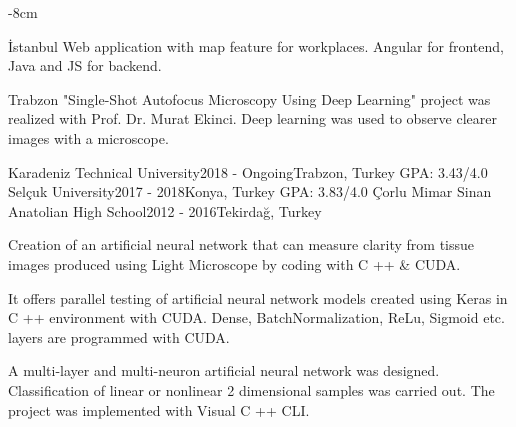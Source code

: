 \documentclass[10pt,a4paper]{altacv}
\begin{document}

\begin{adjustwidth}{}{-8cm}
\makecvheader
\end{adjustwidth}

 {İstanbul}
Web application with map feature for workplaces. Angular for frontend, Java and JS for backend.

\smallskip

 {Trabzon}
"Single-Shot Autofocus Microscopy Using Deep Learning" project was realized with Prof. Dr. Murat Ekinci. Deep learning was used to observe clearer images with a microscope.


 {Karadeniz Technical University}{2018 - Ongoing}{Trabzon, Turkey} 
\textsc{GPA}: 3.43/4.0
\smallskip
\cvevent{} {Selçuk University}{2017 - 2018}{Konya, Turkey} 
\textsc{GPA}: 3.83/4.0
\smallskip
\cvevent{} {Çorlu Mimar Sinan Anatolian High School}{2012 -  2016}{Tekirdağ, Turkey}

 {}

Creation of an artificial neural network that can measure clarity from tissue images produced using Light Microscope by coding with C ++ \& CUDA.

\divider

It offers parallel testing of artificial neural network models created using Keras in C ++ environment with CUDA. Dense, BatchNormalization, ReLu, Sigmoid etc. layers are programmed with CUDA.

\divider

A multi-layer and multi-neuron artificial neural network was designed. Classification of linear or nonlinear 2 dimensional samples was carried out. The project was implemented with Visual C ++ CLI.
\end{document}
